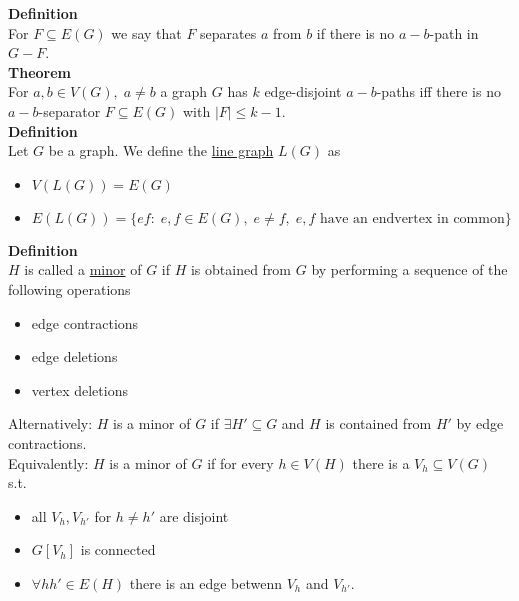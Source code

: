 \documentclass[a4paper, 12pt]{article}
\begin{document}
	\textbf{Definition}\\
	For $F \subseteq E(G)$ we say that $F$ separates $a$ from $b$ if there is no $a-b$-path in $G-F$.\\
	\textbf{Theorem}\\
	For $a,b \in V(G), \; a \neq b$ a graph $G$ has $k$ edge-disjoint $a-b$-paths iff there is no $a-b$-separator $F \subseteq E(G)$ with $\left|F\right|\leq k-1$.\\
	\textbf{Definition}\\
	Let $G$ be a graph. We define the \underline{line graph} $L(G)$ as \begin{itemize}
		\item $V(L(G)) = E(G)$
		\item $E(L(G)) = \{ef: \; e,f \in E(G), \; e \neq f, \; e,f \text{ have an endvertex in common}\}$
	\end{itemize}
	\textbf{Definition}\\
	$H$ is called a \underline{minor} of $G$ if $H$ is obtained from $G$ by performing a sequence of the following operations \begin{itemize}
		\item edge contractions
		\item edge deletions
		\item vertex deletions
	\end{itemize}
	Alternatively: $H$ is a minor of $G$ if $\exists H' \subseteq G$ and $H$ is contained from $H'$ by edge contractions.\\
	Equivalently: $H$ is a minor of $G$ if for every $h \in V(H)$ there is a $V_h \subseteq V(G)$ s.t. \begin{itemize}
		\item all $V_h, V_{h'}$ for $h \neq h'$ are disjoint
		\item $G[V_h]$ is connected
		\item $\forall hh' \in E(H)$ there is an edge betwenn $V_h$ and $V_{h'}$.
	\end{itemize}
\end{document}
